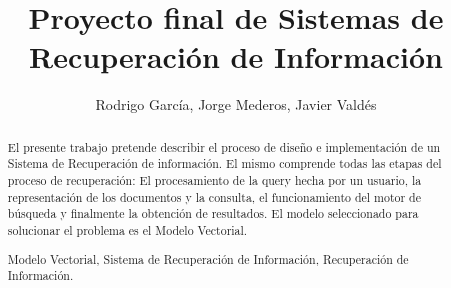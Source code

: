 \documentclass[runningheads,a4paper]{llncs}
\newcommand{\keywords}[1]{\par\addvspace\baselineskip
\noindent\keywordname\enspace\ignorespaces#1}
\begin{document}
\mainmatter  %

\title{Proyecto final de Sistemas de Recuperación de Información}


%
%
\author{Rodrigo García, Jorge Mederos, Javier Valdés}
%


%
%

\maketitle


\begin{abstract}
El presente trabajo pretende describir el proceso de diseño e implementación de un Sistema de Recuperación de información. El mismo comprende todas las etapas del proceso de recuperación: El procesamiento de la query hecha por un usuario, la representación de los documentos y la consulta, el funcionamiento del motor de búsqueda y finalmente la obtención de resultados. El modelo seleccionado para solucionar el problema es el Modelo Vectorial.
\keywords{Modelo Vectorial, Sistema de Recuperación de Información, Recuperación de Información.}
\end{abstract}
\end{document}
